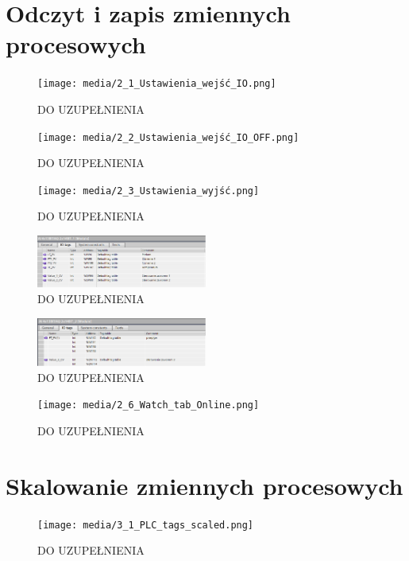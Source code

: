 \documentclass{article}
\begin{document}
\newpage
\section{Odczyt i zapis zmiennych procesowych}

\begin{figure}[H]
    \centering
    \texttt{[image: media/2\_1\_Ustawienia\_wejść\_IO.png]}
    \caption{DO UZUPEŁNIENIA}
    \label{fig:zdj4}
\end{figure}

\begin{figure}[H]
    \centering
    \texttt{[image: media/2\_2\_Ustawienia\_wejść\_IO\_OFF.png]}
    \caption{DO UZUPEŁNIENIA}
    \label{fig:zdj5}
\end{figure}

\begin{figure}[H]
    \centering
    \texttt{[image: media/2\_3\_Ustawienia\_wyjść.png]}
    \caption{DO UZUPEŁNIENIA}
    \label{fig:zdj6}
\end{figure}

\begin{figure}[H]
    \centering
    \includegraphics[width=0.5\textwidth]{media/2_4_Tagi_moduł_1.png}
    \caption{DO UZUPEŁNIENIA}
    \label{fig:zdj7}
\end{figure}

\begin{figure}[H]
    \centering
    \includegraphics[width=0.5\textwidth]{media/2_5_Tagi_moduł_2.png}
    \caption{DO UZUPEŁNIENIA}
    \label{fig:zdj8}
\end{figure}

\begin{figure}[H]
    \centering
    \texttt{[image: media/2\_6\_Watch\_tab\_Online.png]}
    \caption{DO UZUPEŁNIENIA}
    \label{fig:zdj9}
\end{figure}

\newpage
\section{Skalowanie zmiennych procesowych}
\begin{figure}[H]
    \centering
    \texttt{[image: media/3\_1\_PLC\_tags\_scaled.png]}
    \caption{DO UZUPEŁNIENIA}
    \label{fig:zdj10}
\end{figure}
\end{document}

